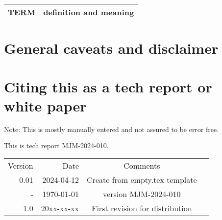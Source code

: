 \documentclass[aps,secnumarabic,balancelastpage,amsmath,amssymb,nofootinbib]{revtex4}
\newcommand{\mjmversion}{\mjmrelease} %
\newcommand{\mjmtrno}{MJM-2024-010}
\newcommand{\mjmversion}{0.00} %
\newcommand{\mjmtrno}{MJM-2024-010}
\newcommand{\mjmmakedate}{2024-04-12 }
\begin{document}
\begin{mdpicomment}
\begin{comment}
\end{comment}


\noindent
\begin{tabular}{@{}ll}
TERM & definition and meaning   \\
\hline
\end{tabular} %


\section{General caveats and disclaimer }
\label{appendix:caveats}

%



\section{Citing this as a tech report or white paper }
\label{appendix:citing}

Note: This is mostly manually entered and not assured to be error free.

This is tech report \mjmtrno. 

\begin{table}[H] \centering
\begin{tabular}{r|r|c|r}
Version & Date & Comments  &  \\
0.01 & \mjmmakedate  &  Create from empty.tex template  &  \\
-  & \today & version  \mjmversion { }   \mjmtrno  &  \\
1.0 & 20xx-xx-xx & First revision for distribution &  \\
\end{tabular}
\end{table}


\end{mdpicomment}
\end{document}
